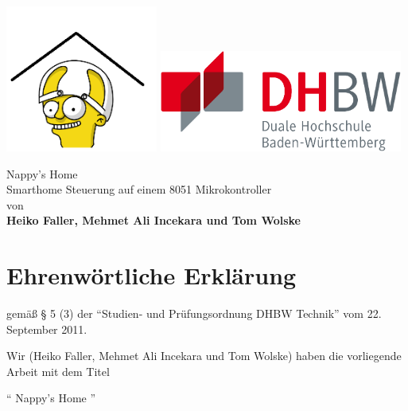 \documentclass[fontsize=12pt,DIV=11,BCOR=4mm,fleqn]{scrartcl}
\begin{document}
	\begin{titlepage}
		\begin{center}
			\includegraphics[width=5cm]{nappy.png} \hfill \includegraphics[width=8cm]{dhbw.pdf}
			
			\vfill
			\begin{singlespacing}
				{\Huge Nappy's Home} \\ [0.25cm]
				{\Large Smarthome Steuerung auf einem 8051 Mikrokontroller}	\\  \vspace{1.7cm}
				{\large von} 	\\ [0.25cm]
				{\large \bfseries Heiko Faller, Mehmet Ali Incekara und Tom Wolske}	\\ [1cm]
			\end{singlespacing} 
			\vfill
		\end{center}
	\end{titlepage}
	\clearscrheadings
	
	\vspace*{2.5cm}
	\section*{Ehrenwörtliche Erklärung}
	gemäß § 5 (3) der "`Studien- und Prüfungsordnung DHBW Technik"' vom 22. September 2011. \vspace{5pt}

	Wir (Heiko Faller, Mehmet Ali Incekara und Tom Wolske) haben die vorliegende Arbeit mit dem Titel
	
	\begin{center}
		"` Nappy's Home "'
	\end{center}
	
\end{document}

